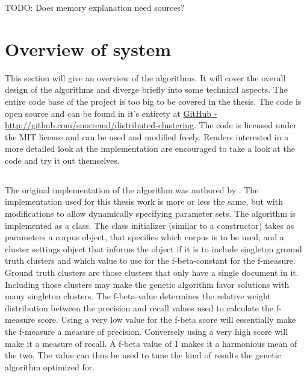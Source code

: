 TODO: Does memory explanation need sources?

\section{Overview of system}
This section will give an overview of the algorithms. It will cover the overall design of the algorithms and diverge briefly into some technical aspects. The entire code base of the project is too big to be covered in the thesis. The code is open source and can be found in it's entirety at \href{http://github.com/snorremd/distributed-clustering}{GitHub - http://github.com/snorremd/distributed-clustering}. The code is licensed under the MIT license and can be used and modified freely. Readers interested in a more detailed look at the implementation are encouraged to take a look at the code and try it out themselves.

\subsection{\CTC}
The original implementation of the \CTC algorithm was authored by \supervisor. The implementation used for this thesis work is more or less the same, but with modifications to allow dynamically specifying parameter sets. The \CTC algorithm is implemented as a class. The class initializer (similar to a constructor) takes as parameters a corpus object, that specifies which corpus is to be used, and a cluster settings object that informs the \CTC object if it is to include singleton ground truth clusters and which value to use for the f-beta-constant for the f-measure. Ground truth clusters are those clusters that only have a single document in it. Including those clusters may make the genetic algorithm favor solutions with many singleton clusters. The f-beta-value determines the relative weight distribution between the precision and recall values used to calculate the f-measure score. Using a very low value for the f-beta score will essentially make the f-measure a measure of precision. Conversely using a very high score will make it a measure of recall. A f-beta value of 1 makes it a harmonious mean of the two. The value can thus be used to tune the kind of results the genetic algorithm optimized for.


